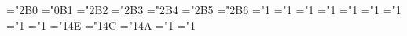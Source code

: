 { \def\hmddot{\ifnum\fam=\m@ne\mathaccent"0\mthsy@@52 \else\@ddot@\fi}%
 \def\hmdotup{\mathaccent"0\mthsy@@54 }%
 \def\hmddotup{\mathaccent"0\mthsy@@55 }%
 \def\hmoacc{\mathaccent"0\mthsy@@56 }%
 \def\hmdddot{\mathaccent"0\mthsy@@ AB }%
 \def\hmddddot{\mathaccent"0\mthsy@@ AC }%
 \def\hmdddotup{\mathaccent"0\mthsy@@ AD }%
 \def\hmddddotup{\mathaccent"0\mthsy@@ AE }%
 \def\hmrelbar{\mathrel{\smash{\hm-}}}%
 \mathchardef\hmsimarrow="2\mthsy@@ B0
 \mathchardef\hmdigamma="0\mthsy@@ B1
 \mathchardef\hmvarland="2\mthsy@@ B2
 \mathchardef\hmcontraction="2\mthsy@@ B3
 \mathchardef\hmcoloneq="2\mthsy@@ B4
 \mathchardef\hmeqcolon="2\mthsy@@ B5
 \mathchardef\hmhateq="2\mthsy@@ B6
 \ifx\amstexloaded@\relax
  \Makeacc@{}%
  \Makeacc@{}%
  \Makeacc@{}%
  \Makeacc@{}%
  \Makeacc@{}%
  \Makeacc@{}%
  \Makeacc@{}%
  \Makeacc@{}%
  \Makeacc@{}%
  \Makeacc@{}%
  \Makeacc@{}%
  \Makeacc@{}%
  \Makeacc@{}%
  \Makeacc@{}%
  \Makeacc@{}%
  \Makeacc@{}%
 \fi
 \def\hmwbar{\mathaccent"0\mthsy@@78 }%
 \def\hmwwbar{\mathaccent"0\mthsy@@53 }%
 \def\hmwhat{\mathaccent"0\mthsy@@79 }%
 \def\hmwtilde{\mathaccent"0\mthsy@@7A }%
 \def\hmwcheck{\mathaccent"0\mthsy@@7B }%
 \def\hmwwhat{\mathaccent"0\mthex@@80 }%
 \def\hmwwtilde{\mathaccent"0\mthex@@81 }%
 \def\hmwwcheck{\mathaccent"0\mthex@@7D }%
 \def\hmwidehat{\mathaccent"0\mthex@@62 }%
 \def\hmwidetilde{\mathaccent"0\mthex@@65 }%
 \def\hmwidecheck{\mathaccent"0\mthex@@7A }%
 \ifx\amstexloaded@\relax
  \Makeacc@{}%
  \Makeacc@{}%
  \Makeacc@{}%
  \Makeacc@{}%
  \Makeacc@{}%
  \Makeacc@{}%
  \Makeacc@{}%
  \Makeacc@{}%
 \fi
 \mathchardef\hmcoprod="1
 \mathchardef\hmbigvee="1
 \mathchardef\hmbigwedge="1
 \mathchardef\hmbiguplus="1
 \mathchardef\hmbigcap="1
 \mathchardef\hmbigcup="1
 \mathchardef\hmintop="1 \def\hmint{\hmintop\nolimits}%
 \mathchardef\hmprod="1
 \mathchardef\hmsum="1
 \mathchardef\hmbigotimes="1\mthex@@4E
 \mathchardef\hmbigoplus="1\mthex@@4C
 \mathchardef\hmbigodot="1\mthex@@4A
 \mathchardef\hmointop="1 \def\hmoint{\ointop\nolimits}%
 \mathchardef\hmointop="1 \def\hmoint{\ointop\nolimits}%
}
